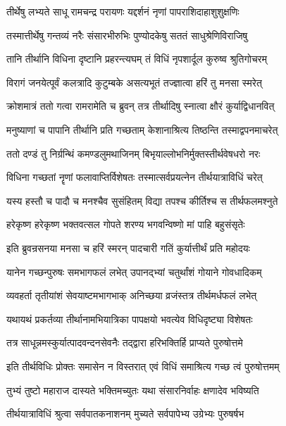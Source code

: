 \twolineshloka
{तीर्थेषु लभ्यते साधू रामचन्द्र परायणः}
{यद्दर्शनं नृणां पापराशिदाहाशुशुक्षणिः}%

\twolineshloka
{तस्मात्तीर्थेषु गन्तव्यं नरैः संसारभीरुभिः}
{पुण्योदकेषु सततं साधुश्रेणिविराजिषु}%

\twolineshloka
{तानि तीर्थानि विधिना दृष्टानि प्रहरन्त्यघम्}
{तं विधिं नृपशार्दूल कुरुष्व श्रुतिगोचरम्}%

\twolineshloka
{विरागं जनयेत्पूर्वं कलत्रादि कुटुम्बके}
{असत्यभूतं तज्ज्ञात्वा हरिं तु मनसा स्मरेत्}%

\twolineshloka
{क्रोशमात्रं ततो गत्वा रामरामेति च ब्रुवन्}
{तत्र तीर्थादिषु स्नात्वा क्षौरं कुर्याद्विधानवित्}%

\twolineshloka
{मनुष्याणां च पापानि तीर्थानि प्रति गच्छताम्}
{केशानाश्रित्य तिष्ठन्ति तस्माद्वपनमाचरेत्}%

\twolineshloka
{ततो दण्डं तु निर्ग्रन्थिं कमण्डलुमथाजिनम्}
{बिभृयाल्लोभनिर्मुक्तस्तीर्थवेषधरो नरः}%

\twolineshloka
{विधिना गच्छतां नॄणां फलावाप्तिर्विशेषतः}
{तस्मात्सर्वप्रयत्नेन तीर्थयात्राविधिं चरेत्}%

\twolineshloka
{यस्य हस्तौ च पादौ च मनश्चैव सुसंहितम्}
{विद्या तपश्च कीर्तिश्च स तीर्थफलमश्नुते}%

\twolineshloka
{हरेकृष्ण हरेकृष्ण भक्तवत्सल गोपते}
{शरण्य भगवन्विष्णो मां पाहि बहुसंसृतेः}%

\twolineshloka
{इति ब्रुवन्रसनया मनसा च हरिं स्मरन्}
{पादचारी गतिं कुर्यात्तीर्थं प्रति महोदयः}%

\twolineshloka
{यानेन गच्छन्पुरुषः समभागफलं लभेत्}
{उपानद्भ्यां चतुर्थांशं गोयाने गोवधादिकम्}%

\twolineshloka
{व्यवहर्ता तृतीयांशं सेवयाष्टमभागभाक्}
{अनिच्छया व्रजंस्तत्र तीर्थमर्धफलं लभेत्}%

\twolineshloka
{यथायथं प्रकर्तव्या तीर्थानामभियात्रिका}
{पापक्षयो भवत्येव विधिदृष्ट्या विशेषतः}%

\twolineshloka
{तत्र साधून्नमस्कुर्यात्पादवन्दनसेवनैः}
{तद्द्वारा हरिभक्तिर्हि प्राप्यते पुरुषोत्तमे}%

\twolineshloka
{इति तीर्थविधिः प्रोक्तः समासेन न विस्तरात्}
{एवं विधिं समाश्रित्य गच्छ त्वं पुरुषोत्तमम्}%

\twolineshloka
{तुभ्यं तुष्टो महाराज दास्यते भक्तिमच्युतः}
{यथा संसारनिर्वाहः क्षणादेव भविष्यति}%

\twolineshloka
{तीर्थयात्राविधिं श्रुत्वा सर्वपातकनाशनम्}
{मुच्यते सर्वपापेभ्य उग्रेभ्यः पुरुषर्षभ}%

